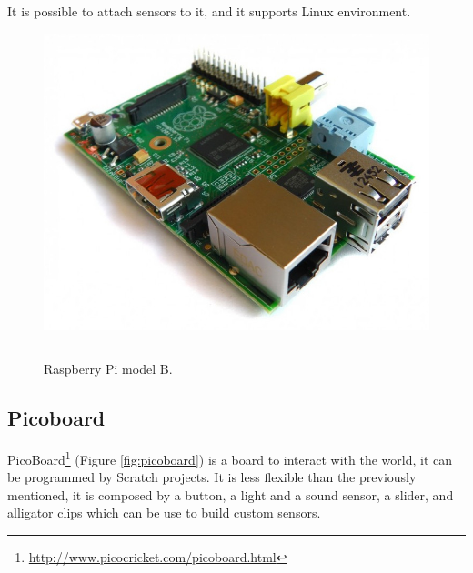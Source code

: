 \documentclass[12pt, a4paper,twoside]{tesi_upf}
\begin{document}
      It is possible to attach sensors to it, and it supports Linux environment.
      \begin{figure}[htbp]
          \centering
              \includegraphics[scale=0.2]{./Figures/raspberry-pi-model-b.jpg}
              \\
              \rule{15em}{0.5pt}
          \caption[Raspberry Pi model B]{Raspberry Pi model B.}
          \label{fig:RaspberryPiB}
       \end{figure}
    
    \subsection{Picoboard}      
      PicoBoard\footnote{\url{http://www.picocricket.com/picoboard.html}} (Figure \ref{fig:picoboard}) is a board to interact with the world, it can be programmed by Scratch projects. It is less flexible than the previously mentioned, it is composed by a button, a light and a sound sensor, a slider, and alligator clips which can be use to build custom sensors.
      
\end{document}
